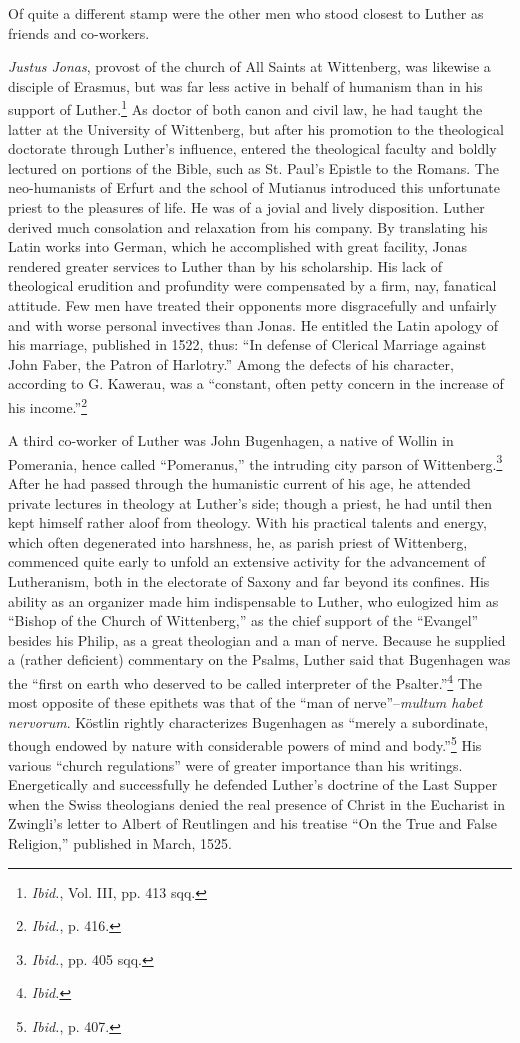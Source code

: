Of quite a different stamp were the other men who stood closest
to Luther as friends and co-workers.

\textit{Justus Jonas}, provost of the church of All Saints at Wittenberg,
was likewise a disciple of Erasmus, but was far less active in behalf
of humanism than in his support of Luther.\footnote
{\textit{Ibid.}, Vol. III, pp. 413 sqq.}
As doctor of both
canon and civil law, he had taught the latter at the University of
Wittenberg, but after his promotion to the theological doctorate
through Luther’s influence, entered the theological faculty and
boldly lectured on portions of the Bible, such as St. Paul’s Epistle to
the Romans. The neo-humanists of Erfurt and the school of Mutianus
introduced this unfortunate priest to the pleasures of life. He was
of a jovial and lively disposition. Luther derived much consolation and
relaxation from his company. By translating his Latin works
into German, which he accomplished with great facility, Jonas rendered
greater services to Luther than by his scholarship. His lack of
theological erudition and profundity were compensated by a firm,
nay, fanatical attitude. Few men have treated their opponents more
disgracefully and unfairly and with worse personal invectives than
Jonas. He entitled the Latin apology of his marriage, published in
1522, thus: “In defense of Clerical Marriage against John Faber,
the Patron of Harlotry.” Among the defects of his character, according
to G. Kawerau, was a “constant, often petty concern in
the increase of his income.”\footnote{\textit{Ibid.}, p. 416.}

A third co-worker of Luther was John Bugenhagen, a native of
Wollin in Pomerania, hence called “Pomeranus,” the intruding
city parson of Wittenberg.\footnote{\textit{Ibid.}, pp. 405 sqq.}
After he had passed through the
humanistic current of his age, he attended private lectures in theology
at Luther’s side; though a priest, he had until then kept himself
rather aloof from theology. With his practical talents and energy,
which often degenerated into harshness, he, as parish priest of Wittenberg,
commenced quite early to unfold an extensive activity for
the advancement of Lutheranism, both in the electorate of Saxony
and far beyond its confines. His ability as an organizer made him
indispensable to Luther, who eulogized him as “Bishop of the Church
of Wittenberg,” as the chief support of the “Evangel” besides his
Philip, as a great theologian and a man of nerve. Because he supplied
a (rather deficient) commentary on the Psalms, Luther said that
Bugenhagen was the “first on earth who deserved to be called interpreter
of the Psalter.”\footnote{\textit{Ibid.}}
The most opposite of these epithets
was that of the “man of nerve”--\textit{multum habet nervorum}. Köstlin
rightly characterizes Bugenhagen as “merely a subordinate, though
endowed by nature with considerable powers of mind and body.”\footnote{\textit{Ibid.}, p. 407.}
His various “church regulations” were of greater importance than
his writings. Energetically and successfully he defended Luther’s
doctrine of the Last Supper when the Swiss theologians denied the
real presence of Christ in the Eucharist in Zwingli’s letter to Albert
of Reutlingen and his treatise “On the True and False Religion,”
published in March, 1525.


